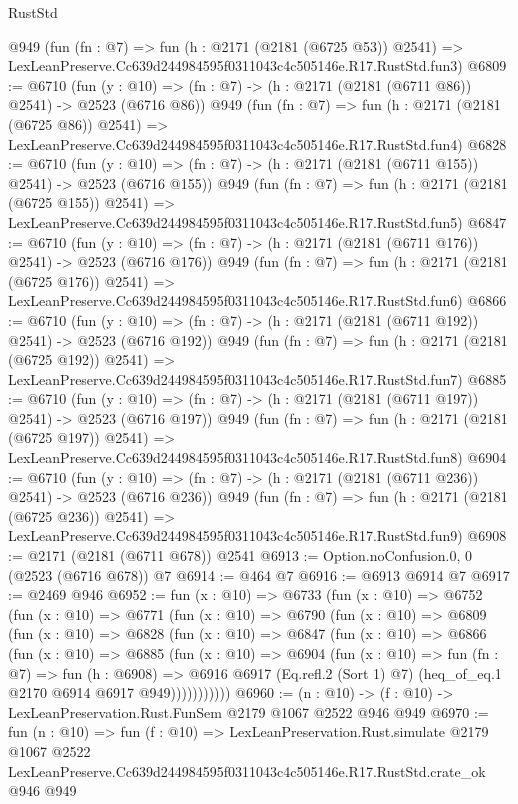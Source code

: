 \begin{lexlean}{RustStd}
\begin{coremodule}
    @949
    (fun (fn : @7) =>
    fun (h : @2171 (@2181 (@6725 @53)) @2541) =>
    LexLeanPreserve.Cc639d244984595f0311043c4c505146e.R17.RustStd.fun3)
@6809 := @6710
    (fun (y : @10) => (fn : @7) -> (h : @2171 (@2181 (@6711 @86)) @2541) -> @2523 (@6716 @86))
    @949
    (fun (fn : @7) =>
    fun (h : @2171 (@2181 (@6725 @86)) @2541) =>
    LexLeanPreserve.Cc639d244984595f0311043c4c505146e.R17.RustStd.fun4)
@6828 := @6710
    (fun (y : @10) => (fn : @7) -> (h : @2171 (@2181 (@6711 @155)) @2541) -> @2523 (@6716 @155))
    @949
    (fun (fn : @7) =>
    fun (h : @2171 (@2181 (@6725 @155)) @2541) =>
    LexLeanPreserve.Cc639d244984595f0311043c4c505146e.R17.RustStd.fun5)
@6847 := @6710
    (fun (y : @10) => (fn : @7) -> (h : @2171 (@2181 (@6711 @176)) @2541) -> @2523 (@6716 @176))
    @949
    (fun (fn : @7) =>
    fun (h : @2171 (@2181 (@6725 @176)) @2541) =>
    LexLeanPreserve.Cc639d244984595f0311043c4c505146e.R17.RustStd.fun6)
@6866 := @6710
    (fun (y : @10) => (fn : @7) -> (h : @2171 (@2181 (@6711 @192)) @2541) -> @2523 (@6716 @192))
    @949
    (fun (fn : @7) =>
    fun (h : @2171 (@2181 (@6725 @192)) @2541) =>
    LexLeanPreserve.Cc639d244984595f0311043c4c505146e.R17.RustStd.fun7)
@6885 := @6710
    (fun (y : @10) => (fn : @7) -> (h : @2171 (@2181 (@6711 @197)) @2541) -> @2523 (@6716 @197))
    @949
    (fun (fn : @7) =>
    fun (h : @2171 (@2181 (@6725 @197)) @2541) =>
    LexLeanPreserve.Cc639d244984595f0311043c4c505146e.R17.RustStd.fun8)
@6904 := @6710
    (fun (y : @10) => (fn : @7) -> (h : @2171 (@2181 (@6711 @236)) @2541) -> @2523 (@6716 @236))
    @949
    (fun (fn : @7) =>
    fun (h : @2171 (@2181 (@6725 @236)) @2541) =>
    LexLeanPreserve.Cc639d244984595f0311043c4c505146e.R17.RustStd.fun9)
@6908 := @2171 (@2181 (@6711 @678)) @2541
@6913 := Option.noConfusion.{0, 0} (@2523 (@6716 @678)) @7
@6914 := @464 @7
@6916 := @6913 @6914 @7
@6917 := @2469 @946
@6952 := fun (x : @10) =>
  @6733
    (fun (x : @10) =>
    @6752
      (fun (x : @10) =>
      @6771
        (fun (x : @10) =>
        @6790
          (fun (x : @10) =>
          @6809
            (fun (x : @10) =>
            @6828
              (fun (x : @10) =>
              @6847
                (fun (x : @10) =>
                @6866
                  (fun (x : @10) =>
                  @6885
                    (fun (x : @10) =>
                    @6904
                      (fun (x : @10) =>
                      fun (fn : @7) =>
                      fun (h : @6908) =>
                      @6916
                        @6917
                        (Eq.refl.{2} (Sort 1) @7)
                        (heq_of_eq.{1} @2170 @6914 @6917 @949)))))))))))
@6960 := (n : @10) -> (f : @10) -> LexLeanPreservation.Rust.FunSem @2179 @1067 @2522 @946 @949
@6970 := fun (n : @10) =>
  fun (f : @10) =>
  LexLeanPreservation.Rust.simulate
    @2179
    @1067
    @2522
    LexLeanPreserve.Cc639d244984595f0311043c4c505146e.R17.RustStd.crate_ok
    @946
    @949
\end{coremodule}
\end{lexlean}
